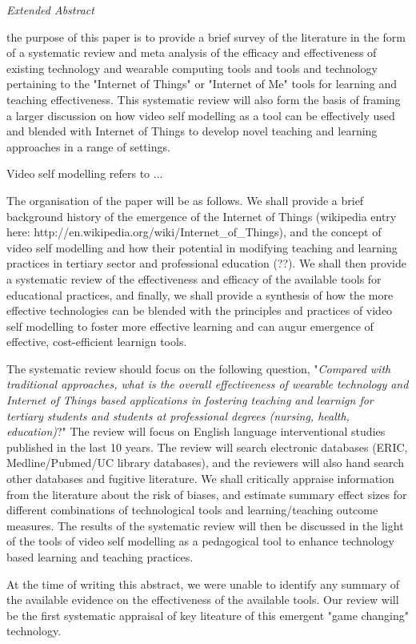\textit{Extended Abstract} 

the purpose of this paper is to provide a brief survey of the literature in the form of a systematic review and meta analysis of the efficacy and effectiveness of existing technology and wearable computing tools and tools and technology pertaining to the "Internet of Things" or "Internet of Me" tools for learning and teaching effectiveness. This systematic review will also form the basis of framing a larger discussion on how video self modelling as a tool can be effectively used and blended with Internet of Things to develop novel teaching and learning approaches in a range of settings. 

Video self modelling refers to ... 

The organisation of the paper will be as follows. We shall provide a brief background history of the emergence of the Internet of Things (wikipedia entry here: http://en.wikipedia.org/wiki/Internet_of_Things), and the concept of video self modelling and how their potential in modifying teaching and learning practices in tertiary sector and professional education (??). We shall then provide a systematic review of the effectiveness and efficacy of the available tools for educational practices, and finally, we shall provide a synthesis of how the more effective technologies can be blended with the principles and practices of video self modelling to foster more effective learning and can augur emergence of effective, cost-efficient learnign tools.

The systematic review should focus on the following question, "\textit{Compared with traditional approaches, what is the overall effectiveness of wearable technology and Internet of Things based applications in fostering teaching and learnign for tertiary students and students at professional degrees (nursing, health, education)}?" The review will focus on English language interventional studies published in the last 10 years. The review will search electronic databases (ERIC, Medline/Pubmed/UC library databases), and the reviewers will also hand search other databases and fugitive literature. We shall critically appraise information from the literature about the risk of biases, and estimate summary effect sizes for different combinations of technological tools and learning/teaching outcome measures. The results of the systematic review will then be discussed in the light of the tools of video self modelling as a pedagogical tool to enhance technology based learning and teaching practices. 

At the time of writing this abstract, we were unable to identify any summary of the available evidence on the effectiveness of the available tools. Our review will be the first systematic appraisal of key liteature of this emergent "game changing" technology. 